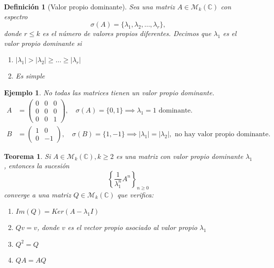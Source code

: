 \documentclass[11pt, a4paper]{article}
\newif\IfInSansMode
\numberwithin{equation}{section}
\theoremstyle{theorem-style}
\newtheorem{nth}{Teorema}[section]
\theoremstyle{definition-style}
\newtheorem{ndef}{Definición}[section]
\theoremstyle{remark-style}
\theoremstyle{example-style}
\newtheorem{ejemplo}{Ejemplo}[section]
\newenvironment{nlist}
{\begin{enumerate}
    \renewcommand\labelenumi{(\emph{\roman{enumi})}}}
  {\end{enumerate}}
\begin{document}
\begin{ndef}[Valor propio dominante]
    Sea una matriz $A \in \mathcal M_k (\mathbb C)$ con espectro
    $$ \sigma(A) = \{ \lambda_1, \lambda_2, \hdots, \lambda_r \},$$
    donde $r \leq k$ es el número de valores propios diferentes.
    Decimos que $\lambda_1$ es el \textit{valor propio dominante} si 
    \begin{nlist}
        \item $|\lambda_1| > |\lambda_2| \geq \dots \geq |\lambda_r|$
        \item Es simple
    \end{nlist}
\end{ndef}

\begin{ejemplo} No todas las matrices tienen un valor propio dominante.
    \begin{align*}
        \label{}
        A &= \begin{pmatrix}
            0 & 0 & 0 \\
            0 & 0 & 0 \\
            0 & 0 & 1
        \end{pmatrix}, \quad \sigma(A) = \{0, 1 \} \implies \lambda_1 = 1 \text{ dominante.} \\
        B &= \begin{pmatrix}
            1 & 0 \\
            0 & -1
        \end{pmatrix}, \quad \sigma(B) = \{ 1, -1 \} \implies |\lambda_1| = |\lambda_2|, \text{ no hay valor propio dominante.}
    \end{align*}
\end{ejemplo}

\begin{nth}
    Si $A \in \mathcal M_k (\mathbb C), k\ge 2$ es una matriz con valor propio dominante $\lambda_1$, entonces la sucesión $$ \left\{ \frac{1}{\lambda_1^n}A^n \right\}_{n \geq 0}$$ converge a una matriz $Q \in \mathcal M_k (\mathbb C)$ que verifica:
    \begin{nlist}
        \item $Im(Q) = Ker(A - \lambda_1I)$
        \item $Qv = v$, donde $v$ es el vector propio asociado al valor propio $\lambda_1$
        \item $Q^2 = Q$
        \item $QA = AQ$
    \end{nlist}
\end{nth}
\end{document}
